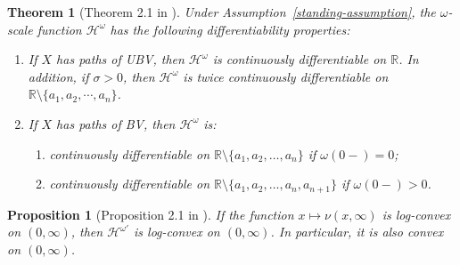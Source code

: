 \documentclass[10pt,a4paper]{amsart}
\newtheorem{theorem}{Theorem}[section]
\newtheorem{proposition}{Proposition}[section]
\newtheorem{remark}{Remark}[section]
\newcommand{\reals}{\mathbb{R}}
\newcommand{\ind}{\mathbf{1}}
\newcommand{\cH}{\mathcal{H}}
\renewcommand{\geq}{\geqslant}
\begin{document}
\begin{theorem}[Theorem 2.1 in \cite{mata-renaud_2024}]\label{thm:solution-integral-eq}
	Under Assumption~\ref{standing-assumption}, the $\omega$-scale function $\cH^{\omega}$ has the following differentiability properties:
	\begin{enumerate}
		\item If $X$ has paths of UBV, then $\cH^{\omega}$ is continuously differentiable on $\reals$. In addition, if $\sigma >0$, then $\cH^{\omega}$ is twice continuously differentiable on $\reals \setminus \{a_1,a_2,\cdots,a_n\}$.
		\item If $X$ has paths of BV, then $\cH^{\omega}$ is:
		\begin{enumerate}
			\item continuously differentiable on $\reals \setminus \{a_1, a_2, \dots, a_n\}$ if $\omega(0-)=0$;
			\item continuously differentiable on $\reals \setminus \{a_1, a_2, \dots, a_n,a_{n+1}\}$ if $\omega(0-)>0$.
		\end{enumerate}
	\end{enumerate}
\end{theorem}

\begin{proposition}[Proposition 2.1 in \cite{mata-renaud_2024}]\label{prop:log-convex-general}
	If the function $x \mapsto \nu(x,\infty)$ is log-convex on $(0,\infty)$, then $\mathcal{H}^{\omega \prime}$ is log-convex on $(0,\infty)$. In particular, it is also convex on $(0,\infty)$.
\end{proposition}

%
\end{document}
